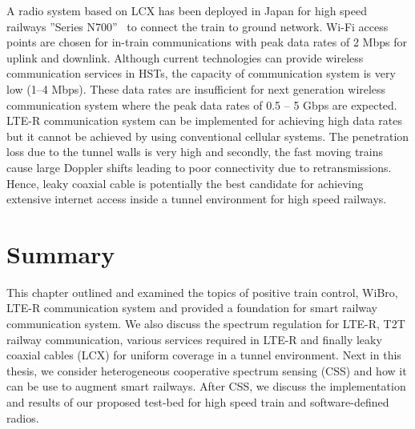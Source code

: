 A radio system based on LCX has been deployed in Japan for high speed railways ''Series N700''~\cite{takatsu2007history} to connect the train to ground network. Wi-Fi access points are chosen for in-train communications with peak data rates of 2 Mbps for uplink and downlink. Although current technologies can provide wireless communication services in HSTs, the capacity of communication system is very low (1--4 Mbps). These data rates are insufficient for next generation wireless communication system where the peak data rates of 0.5 -- 5 Gbps are expected. LTE-R communication system can be implemented for achieving high data rates but it cannot be achieved by using conventional cellular systems. The penetration loss due to the tunnel walls is very high and secondly, the fast moving trains cause large Doppler shifts leading to poor connectivity due to retransmissions. Hence, leaky coaxial cable is potentially the best candidate for achieving extensive internet access inside a tunnel environment for high speed railways.

\section{Summary}
This chapter outlined and examined the topics of positive train control, WiBro, LTE-R communication system and provided a foundation for smart railway communication system. We also discuss the spectrum regulation for LTE-R, T2T railway communication, various services required in LTE-R and finally leaky coaxial cables (LCX) for uniform coverage in a tunnel environment. Next in this thesis, we consider heterogeneous cooperative spectrum sensing (CSS) and how it can be use to augment smart railways. After CSS, we discuss the implementation and results of our proposed test-bed for high speed train and software-defined radios.\\
